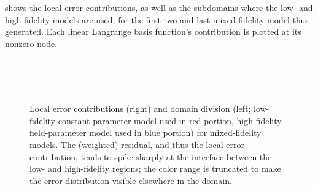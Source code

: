  shows the local error contributions, as well as the subdomains where the low- and high-fidelity models are used, for the first two and last mixed-fidelity model thus generated. Each linear Langrange basis function's contribution is plotted at its nonzero node. 
%
\begin{figure}[htbp]
\centering
{} \\
 \\
 \\
\caption{Local error contributions (right) and domain division (left; low-fidelity constant-parameter model used in red portion, high-fidelity field-parameter model used in blue portion) for mixed-fidelity models. The (weighted) residual, and thus the local error contribution, tends to spike sharply at the interface between the low- and high-fidelity regions; the color range is truncated to make the error distribution visible elsewhere in the domain.}
\label{fig:svfRef}
\end{figure}
